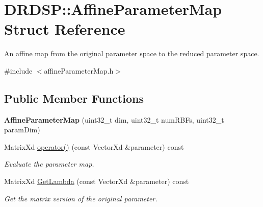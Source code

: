 \hypertarget{struct_d_r_d_s_p_1_1_affine_parameter_map}{\section{D\-R\-D\-S\-P\-:\-:Affine\-Parameter\-Map Struct Reference}
\label{struct_d_r_d_s_p_1_1_affine_parameter_map}
}


An affine map from the original parameter space to the reduced parameter space.  




{\ttfamily \#include $<$affine\-Parameter\-Map.\-h$>$}

\subsection*{Public Member Functions}
\begin{DoxyCompactItemize}
\item 
\hypertarget{struct_d_r_d_s_p_1_1_affine_parameter_map_aec7c72a6f33b412a3fd1326d5bb49d54}{{\bfseries Affine\-Parameter\-Map} (uint32\-\_\-t dim, uint32\-\_\-t num\-R\-B\-Fs, uint32\-\_\-t param\-Dim)}\label{struct_d_r_d_s_p_1_1_affine_parameter_map_aec7c72a6f33b412a3fd1326d5bb49d54}

\item 
\hypertarget{struct_d_r_d_s_p_1_1_affine_parameter_map_ac59316fb45c1d70439c180e28a021c25}{Matrix\-Xd \hyperlink{struct_d_r_d_s_p_1_1_affine_parameter_map_ac59316fb45c1d70439c180e28a021c25}{operator()} (const Vector\-Xd \&parameter) const }\label{struct_d_r_d_s_p_1_1_affine_parameter_map_ac59316fb45c1d70439c180e28a021c25}

\begin{DoxyCompactList}\small\item\em Evaluate the parameter map. \end{DoxyCompactList}\item 
\hypertarget{struct_d_r_d_s_p_1_1_affine_parameter_map_ae983bda2073bac0d8e6aebcc34d51153}{Matrix\-Xd \hyperlink{struct_d_r_d_s_p_1_1_affine_parameter_map_ae983bda2073bac0d8e6aebcc34d51153}{Get\-Lambda} (const Vector\-Xd \&parameter) const }\label{struct_d_r_d_s_p_1_1_affine_parameter_map_ae983bda2073bac0d8e6aebcc34d51153}

\begin{DoxyCompactList}\small\item\em Get the matrix version of the original parameter. \end{DoxyCompactList}\end{DoxyCompactItemize}
